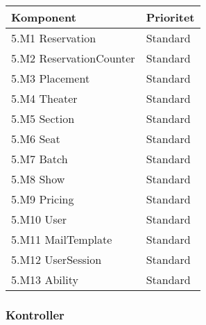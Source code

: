\documentclass[a4paper, twoside, 11pt, titlepage]{article}
\begin{document}
		\begin {table} [ht] \begin{tabular} {  p{10cm} p{5.1cm} }
			\hline
			{\sffamily\textbf{Komponent}} & {\sffamily\textbf{Prioritet}} \\
			\hline
			{ 5.M1 Reservation} & { Standard } \\
			\hline
			{ 5.M2 ReservationCounter} & { Standard } \\
			\hline
			{ 5.M3 Placement} & { Standard } \\
			\hline
			{ 5.M4 Theater} & { Standard } \\
			\hline
			{ 5.M5 Section} & { Standard } \\
			\hline
			{ 5.M6 Seat} & { Standard } \\
			\hline
			{ 5.M7 Batch} & { Standard } \\
			\hline
			{ 5.M8 Show} & { Standard } \\
			\hline
			{ 5.M9 Pricing} & { Standard } \\
			\hline
			{ 5.M10 User} & { Standard } \\
			\hline
			{ 5.M11 MailTemplate} & { Standard } \\
			\hline
			{ 5.M12 UserSession} & { Standard } \\
			\hline
			{ 5.M13 Ability} & { Standard } \\
			\hline
		\end{tabular} \end{table} \FloatBarrier


		\clearpage %
		\subsubsection{Kontroller}
\end{document}
